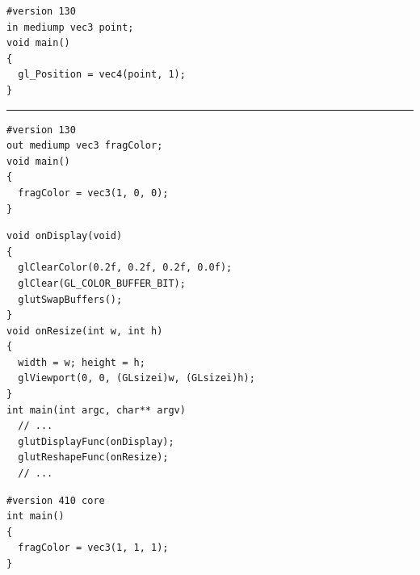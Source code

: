 \documentclass[calcdimensions,landscape,letterpaper]{powersem}
\newcommand{\thecurrentheading}{}
\newcommand{\heading}[1]{\renewcommand{\thecurrentheading}{#1}}
\begin{document}
\begin{slide}
    \heading{Minimal Shaders}
    \begin{center}
        \begin{minipage}[c]{.5\textwidth}
            \begin{verbatim}
#version 130
in mediump vec3 point;
void main()
{
  gl_Position = vec4(point, 1);
}
            \end{verbatim}
            \rule{4cm}{0.4pt}
            \begin{verbatim}
#version 130
out mediump vec3 fragColor;
void main()
{
  fragColor = vec3(1, 0, 0);
}
            \end{verbatim}
        \end{minipage}
    \end{center}
\end{slide}

\begin{slide}
    \heading{GLUT Display Callbacks}
    \begin{center}
        \begin{minipage}[c]{.7\textwidth}
            \begin{verbatim}
void onDisplay(void)
{
  glClearColor(0.2f, 0.2f, 0.2f, 0.0f);
  glClear(GL_COLOR_BUFFER_BIT);
  glutSwapBuffers();
}
void onResize(int w, int h)
{
  width = w; height = h;
  glViewport(0, 0, (GLsizei)w, (GLsizei)h);
}
int main(int argc, char** argv)
  // ...
  glutDisplayFunc(onDisplay);
  glutReshapeFunc(onResize);
  // ...
            \end{verbatim}
        \end{minipage}
    \end{center}
\end{slide}


\begin{slide}
  \heading{GLSL}
  \begin{center}
    \begin{verbatim}
#version 410 core
int main()
{
  fragColor = vec3(1, 1, 1);
}
    \end{verbatim}
  \end{center}
\end{slide}
\end{document}
